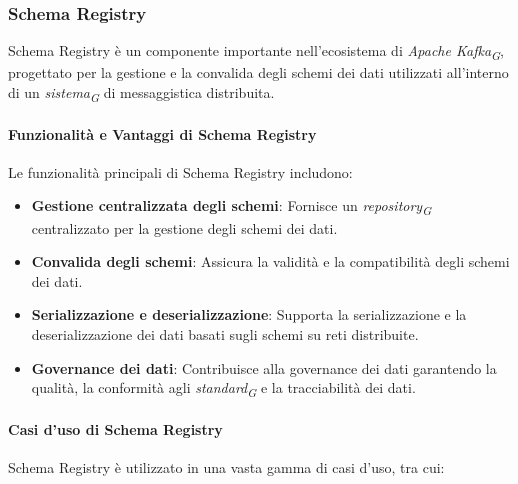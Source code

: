 \subsubsection{Schema Registry}
Schema Registry è un componente importante nell'ecosistema di \textit{Apache Kafka}\textsubscript{\textit{G}}, progettato per la gestione e la convalida degli schemi dei dati utilizzati all'interno di un \textit{sistema}\textsubscript{\textit{G}} di messaggistica distribuita.

\paragraph{Funzionalità e Vantaggi di Schema Registry}
Le funzionalità principali di Schema Registry includono:
\begin{itemize}
    \item \textbf{Gestione centralizzata degli schemi}: Fornisce un \textit{repository}\textsubscript{\textit{G}} centralizzato per la gestione degli schemi dei dati.
    \item \textbf{Convalida degli schemi}: Assicura la validità e la compatibilità degli schemi dei dati.
    \item \textbf{Serializzazione e deserializzazione}: Supporta la serializzazione e la deserializzazione dei dati basati sugli schemi su reti distribuite.
    \item \textbf{Governance dei dati}: Contribuisce alla governance dei dati garantendo la qualità, la conformità agli \textit{standard}\textsubscript{\textit{G}} e la tracciabilità dei dati.
\end{itemize}

\paragraph{Casi d'uso di Schema Registry}

Schema Registry è utilizzato in una vasta gamma di casi d'uso, tra cui:

